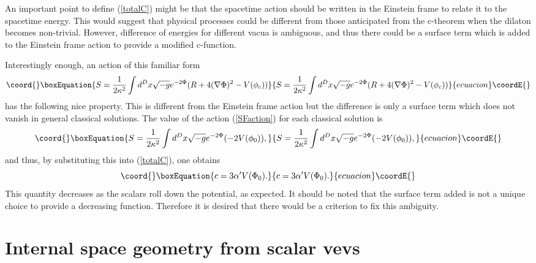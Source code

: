 \documentclass[a4paper,a4paper]{article}
\begin{document}
An important point to define (\ref{totalC}) might be that the spacetime action should be written in the Einstein 
frame to relate it to the spacetime energy. 
This would suggest that physical processes could be different from those anticipated from the c-theorem when the 
dilaton becomes non-trivial. 
However, difference of energies for different vacua is ambiguous, and thus there could be a surface term which 
is added to the Einstein frame action to provide a modified c-function. 

Interestingly enough, an action of this familiar form 
\begin{equation}\coord{}\boxEquation{
S = \frac1{2\kappa^2}\int d^Dx\sqrt{-g}e^{-2\Phi}(R+4(\nabla\Phi)^2-V(\phi_c))
    \label{SFaction}
}{
S = \frac1{2\kappa^2}\int d^Dx\sqrt{-g}e^{-2\Phi}(R+4(\nabla\Phi)^2-V(\phi_c))
    }{ecuacion}\coordE{}\end{equation}
has the following nice property. 
This is different from the Einstein frame action but the difference is only a surface term which does not vanish in 
general classical solutions. 
The value of the action (\ref{SFaction}) for each classical solution is 
\begin{equation}\coord{}\boxEquation{
S = \frac1{2\kappa^2}\int d^Dx\sqrt{-g}e^{-2\Phi}(-2V(\phi_0)),
}{
S = \frac1{2\kappa^2}\int d^Dx\sqrt{-g}e^{-2\Phi}(-2V(\phi_0)),
}{ecuacion}\coordE{}\end{equation}
and thus, by substituting this into (\ref{totalC}), one obtains 
\begin{equation}\coord{}\boxEquation{
c = 3\alpha'V(\Phi_0).
}{
c = 3\alpha'V(\Phi_0).
}{ecuacion}\coordE{}\end{equation}
This quantity decreases as the scalars roll down the potential, as expected. 
It should be noted that the surface term added is not a unique choice to provide a decreasing function. 
Therefore it is desired that there would be a criterion to fix this ambiguity. 




















\vspace{1cm}

\section{Internal space geometry from scalar vevs}  \label{potential}
\end{document}
